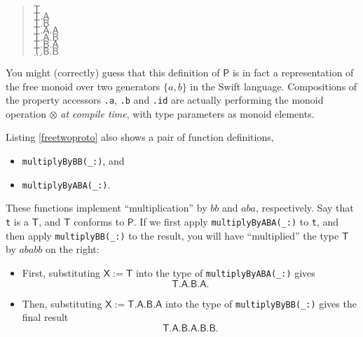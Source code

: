 \documentclass[headsepline,bibliography=totoc]{scrreport}
\newcommand{\namesym}[1]{\mathsf{#1}}
\newcommand{\genericparam}[1]{\bm{\mathsf{#1}}}
\theoremstyle{definition}
\theoremstyle{definition}
\theoremstyle{definition}
\begin{document}
\begin{quote}
\noindent$\genericparam{T}$\\
$\genericparam{T}.\namesym{A}$\\
$\genericparam{T}.\namesym{B}$\\
$\genericparam{T}.\namesym{A}.\namesym{A}$\\
$\genericparam{T}.\namesym{A}.\namesym{B}$\\
$\genericparam{T}.\namesym{B}.\namesym{A}$\\
$\genericparam{T}.\namesym{B}.\namesym{B}$\\
$\ldots$
\end{quote}

You might (correctly) guess that this definition of $\bm{\mathsf{P}}$ is in fact a representation of the free monoid over two generators $\{a, b\}$ in the Swift language. Compositions of the property accessors \texttt{.a}, \texttt{.b} and \texttt{.id} are actually performing the monoid operation $\otimes$ \emph{at compile time}, with type parameters as monoid elements.

Listing \ref{freetwoproto} also shows a pair of function definitions, 
\begin{itemize}
\item \texttt{multiplyByBB(\_:)}, and
\item \texttt{multiplyByABA(\_:)}.
\end{itemize}
These functions implement ``multiplication'' by $bb$ and $aba$, respectively. Say that \texttt{t} is a $\genericparam{T}$, and $\genericparam{T}$ conforms to $\bm{\mathsf{P}}$. If we first apply \texttt{multiplyByABA(\_:)} to \texttt{t}, and then apply \texttt{multiplyBB(\_:)} to the result, you will have ``multiplied'' the type $\genericparam{T}$ by $ababb$ on the right:
\begin{itemize}
\item First, substituting $\genericparam{X}:=\genericparam{T}$ into the type of \texttt{multiplyByABA(\_:)} gives
\[\genericparam{T}.\namesym{A}.\namesym{B}.\namesym{A}.\]
\item Then, substituting $\genericparam{X} := \genericparam{T}.\namesym{A}.\namesym{B}.\namesym{A}$ into the type of \texttt{multiplyByBB(\_:)} gives the final result
\[\genericparam{T}.\namesym{A}.\namesym{B}.\namesym{A}.\namesym{B}.\namesym{B}.\]
\end{itemize}
\end{document}
